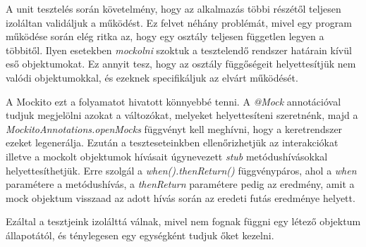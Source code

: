 A unit tesztelés során követelmény, hogy az alkalmazás többi részétől teljesen izoláltan validáljuk a működést. Ez felvet néhány problémát, mivel egy program működése során elég ritka az, hogy egy osztály teljesen független legyen a többitől. Ilyen esetekben \emph{mockolni} szoktuk a tesztelendő rendszer határain kívül eső objektumokat. Ez annyit tesz, hogy az osztály függőségeit helyettesítjük nem valódi objektumokkal, és ezeknek specifikáljuk az elvárt működését.

A Mockito ezt a folyamatot hivatott könnyebbé tenni. A \emph{@Mock} annotációval tudjuk megjelölni azokat a változókat, melyeket helyettesíteni szeretnénk, majd a \emph{MockitoAnnotations.openMocks} függvényt kell meghívni, hogy a keretrendszer ezeket legenerálja. Ezután a teszteseteinkben ellenőrizhetjük az interakciókat illetve a mockolt objektumok hívásait úgynevezett \emph{stub} metódushívásokkal helyettesíthetjük. Erre szolgál a \emph{when().thenReturn()} függvénypáros, ahol a \emph{when} paramétere a metódushívás, a \emph{thenReturn} paramétere pedig az eredmény, amit a mock objektum visszaad az adott hívás során az eredeti futás eredménye helyett.

Ezáltal a tesztjeink izolálttá válnak, mivel nem fognak függni egy létező objektum állapotától, és ténylegesen egy egységként tudjuk őket kezelni.

